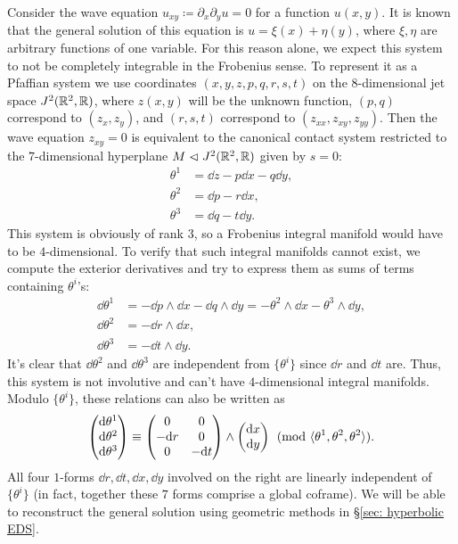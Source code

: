 \begin{example}
    Consider the wave equation $u_{xy}\coloneqq \partial_x\partial_yu=0$ for a function $u(x,y)$. It is known that the general solution of this equation is $u=\xi(x)+\eta(y)$, where $\xi,\eta$ are arbitrary functions of one variable. For this reason alone, we expect this system to not be completely integrable in the Frobenius sense. To represent it as a Pfaffian system we use coordinates $(x,y,z,p,q,r,s,t)$ on the $8$-dimensional jet space $J^2(\mathbb{R}^2,\mathbb{R})$, where $z(x,y)$ will be the unknown function, $(p,q)$ correspond to $(z_x,z_y)$, and $(r,s,t)$ correspond to $(z_{xx},z_{xy},z_{yy})$. Then the wave equation $z_{xy}=0$ is equivalent to the canonical contact system restricted to the $7$-dimensional hyperplane $M\vartriangleleft J^2(\mathbb{R}^2,\mathbb{R})$ given by $s=0$:
    \begin{align}
        \theta^1&= \dd z-p\dd x-q\dd y,\\
        \theta^2&= \dd p- r\dd x,\\
        \theta^3&= \dd q- t\dd y.
    \end{align}
    This system is obviously of rank $3$, so a Frobenius integral manifold would have to be $4$-dimensional. To verify that such integral manifolds cannot exist, we compute the exterior derivatives and try to express them as sums of terms containing $\theta^i$'s:
    \begin{align}
        \dd\theta^1&=-\dd p\wedge \dd x-\dd q\wedge\dd y=-\theta^2\wedge\dd x-\theta^3\wedge \dd y,\\
        \dd\theta^2&=-\dd r\wedge\dd x,\\
        \dd\theta^3&=-\dd t\wedge \dd y.
    \end{align}
    It's clear that $\dd\theta^2$ and $\dd\theta^3$ are independent from $\{\theta^i\}$ since $\dd r$ and $\dd t$ are. Thus, this system is not involutive and can't have $4$-dimensional integral manifolds. Modulo $\{\theta^i\}$, these relations can also be written as 
    \[
        \begin{pmatrix}
            {\mathrm{d}}\theta^1\\
            {\mathrm{d}}\theta^2\\
            {\mathrm{d}}\theta^3
        \end{pmatrix}\equiv
        \begin{pmatrix}
            0 & 0 \\
            -{\mathrm{d}} r & 0\\
            0 & -{\mathrm{d}} t
        \end{pmatrix}\wedge
        \begin{pmatrix}
            {\mathrm{d}} x\\
            {\mathrm{d}} y
        \end{pmatrix} \pmod{\langle\theta^1,\theta^2,\theta^2\rangle}.
    \]
    All four $1$-forms $\dd r,\dd t,\dd x,\dd y$ involved on the right are linearly independent of $\{\theta^i\}$ (in fact, together these $7$ forms comprise a global coframe). We will be able to reconstruct the general solution using geometric methods in \S\ref{sec: hyperbolic EDS}.
\end{example}


